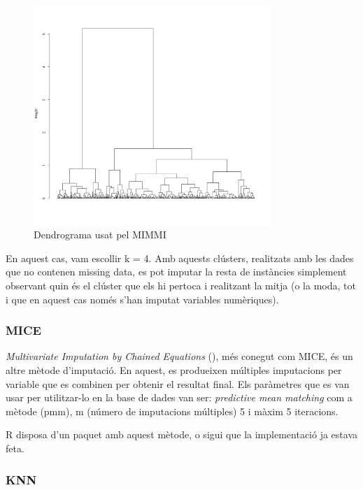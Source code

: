 \begin{figure}[H]
    \centering
    \includegraphics[width=0.8\textwidth]{Images/3_Preprocessing/mimmidend.png}
    \caption{Dendrograma usat pel MIMMI}
    \label{fig:Preprocessing_mimmi_dend}
\end{figure}

En aquest cas, vam escollir k = 4. Amb aquests clústers, realitzats amb les dades que no contenen missing data, es pot imputar la resta de instàncies simplement observant quin és el clúster que els hi pertoca i realitzant la mitja (o la moda, tot i que en aquest cas només s'han imputat variables numèriques).

\subsubsection{MICE} 
\textit{Multivariate Imputation by Chained Equations} (\cite{stefvanbuuren_2000_multivariate}), més conegut com MICE, és un altre mètode d'imputació. En aquest, es produeixen múltiples imputacions per variable que es combinen per obtenir el resultat final. Els paràmetres que es van usar per utilitzar-lo en la base de dades van ser: \textit{predictive mean matching} com a mètode (pmm), m (número de imputacions múltiples) 5 i màxim 5 iteracions.

R disposa d'un paquet amb aquest mètode, o sigui que la implementació ja estava feta.

\subsubsection{KNN}

